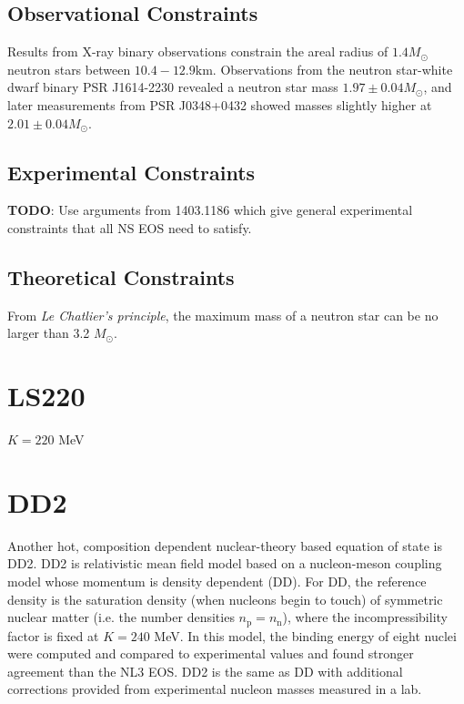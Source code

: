 \subsection{Observational Constraints}

Results from X-ray binary observations constrain the areal radius of $1.4M_\odot$ neutron stars between $10.4 - 12.9 \textrm{km}$.
Observations from the neutron star-white dwarf binary PSR J1614-2230 revealed a neutron star mass $1.97 \pm 0.04 M_\odot$, and later measurements from PSR J0348+0432 showed masses slightly higher at  $2.01 \pm 0.04 M_\odot$.

\subsection{Experimental Constraints}

\textbf{TODO}: Use arguments from 1403.1186 which give general experimental constraints that all NS EOS need to satisfy. 

\subsection{Theoretical Constraints}

From \textit{Le Chatlier's principle}, the maximum mass of a neutron star can be no larger than 3.2 $M_\odot$.

\section{LS220}

$K = 220$ MeV

\section{DD2}

Another hot, composition dependent nuclear-theory based equation of state is DD2.  DD2 is relativistic mean field model based on a nucleon-meson coupling model whose momentum is density dependent (DD).  
For DD, the reference density is the saturation density (when nucleons begin to touch) of symmetric nuclear matter (i.e. the number densities $n_\textrm{p} = n_\textrm{n}$), where the incompressibility factor is fixed at $K = 240$ MeV.
In this model, the binding energy of eight nuclei were computed and compared to experimental values and found stronger agreement than the NL3 EOS.
DD2 is the same as DD with additional corrections provided from experimental nucleon masses measured in a lab.

